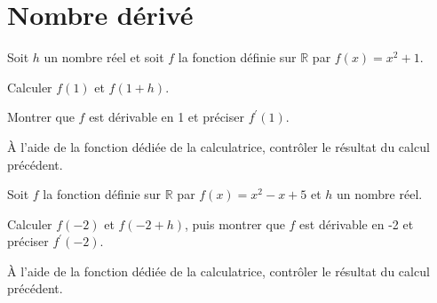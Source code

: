 \documentclass[12pt,a4paper]{article}  %
\begin{document}
	\graphicspath{{img_oblig/}}
	
	\begin{center}
		
		
		\fbox{
			\begin{minipage}[]{15cm}
				\begin{center}
					\LARGE{\rule{0.5cm}{0pt}\rule[-0.25cm]{0pt}{0.9cm}
						\textcolor{red}{Correction - Exercices obligatoires\\
						Dérivation}
					}
				\end{center}
			\end{minipage}
		}
	\end{center}

\section*{Nombre dérivé}

\exercice{} 

Soit $h$ un nombre réel et soit $f$ la fonction définie sur $\mathbb{R}$ par $f(x)=x^2+1$.
\begin{enumMet}
	\item Calculer $f(1)$ et $f(1+h)$.
	\item Montrer que $f$ est dérivable en 1 et préciser $f^{\prime}(1)$.
	\item À l'aide de la fonction dédiée de la calculatrice, contrôler le résultat du calcul précédent.
\end{enumMet}

\exercice{} 

Soit $f$ la fonction définie sur $\mathbb{R}$ par $f(x)=x^2-x+5$ et $h$ un nombre réel.
\begin{enumMet}
	\item Calculer $f(-2)$ et $f(-2+h)$, puis montrer que $f$ est dérivable en -2 et préciser $f^{\prime}(-2)$.
	\item À l'aide de la fonction dédiée de la calculatrice, contrôler le résultat du calcul précédent.
\end{enumMet}

\exercice{}
\end{document}
